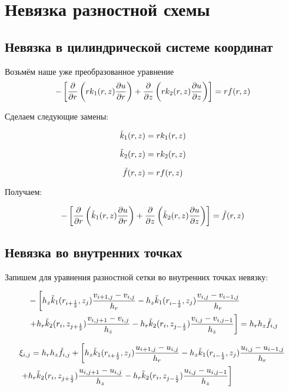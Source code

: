 \section{Невязка разностной схемы}

\subsection{Невязка в цилиндрической системе координат}

Возьмём наше уже преобразованное уравнение
\[
  - \left [ \pdv{}{r} \left ( r k_1(r, z) \pdv{u}{r} \right ) 
  + \pdv{}{z} \left ( rk_2(r, z)\pdv{u}{z} \right ) \right ] = rf(r, z)
\]

Сделаем следующие замены:

\[
  \Tilde{k}_1(r,z) = rk_1(r,z)
\]

\[
  \Tilde{k}_2(r, z) = rk_2(r, z)
\]

\[
  \Tilde{f}(r, z) = rf(r, z)
\]

Получаем:

\[
  - \left [ \pdv{}{r} \left ( \Tilde{k}_1(r, z) \pdv{u}{r} \right ) 
  + \pdv{}{z} \left ( \Tilde{k}_2(r, z)\pdv{u}{z} \right ) \right ] = \Tilde{f}(r, z)
\]

\subsection{Невязка во внутренних точках}

Запишем для уравнения разностной сетки во внутренних точках невязку:

\begin{align*}
  &- \left [ 
  h_z \Tilde{k}_1(r_{i+\frac{1}{2}}, z_j) \frac{v_{i+1, j} - v_{i, j}}{h_{r}}
  - h_z \Tilde{k}_1(r_{i-\frac{1}{2}}, z_j) \frac{v_{i, j} - v_{i - 1, j}}{h_{r}}
  \right . \\
  &\left .
  + h_r \Tilde{k}_2(r_i, z_{j+\frac{1}{2}}) \frac{v_{i, j + 1} - v_{i, j}}{h_{z}}
  - h_r \Tilde{k}_2(r_i, z_{j-\frac{1}{2}}) \frac{v_{i, j} - v_{i, j - 1}}{h_z}
  \right ]  = h_r h_z \Tilde{f}_{i, j}
\end{align*}

\begin{align*}
  &\xi_{i, j} = h_r h_z \Tilde{f}_{i, j} + 
  \left [ 
  h_z \Tilde{k}_1(r_{i+\frac{1}{2}}, z_j) \frac{u_{i+1, j} - u_{i, j}}{h_{r}}
  - h_z \Tilde{k}_1(r_{i-\frac{1}{2}}, z_j) \frac{u_{i, j} - u_{i - 1, j}}{h_{r}}
  \right . \\
  &\left .
  + h_r \Tilde{k}_2(r_i, z_{j+\frac{1}{2}}) \frac{u_{i, j + 1} - u_{i, j}}{h_{z}}
  - h_r \Tilde{k}_2(r_i, z_{j-\frac{1}{2}}) \frac{u_{i, j} - u_{i, j - 1}}{h_z}
  \right ]
\end{align*}

